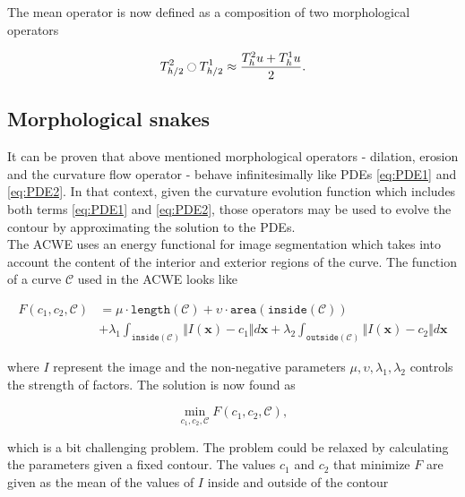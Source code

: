 The mean operator is now defined as a composition of two morphological operators

\begin{equation}
	T_{h/2}^2 \ocircle T_{h/2}^1 \approx \frac{T_h^2u + T_h^1u}{2}.
\end{equation}

\subsection{Morphological snakes}

It can be proven that above mentioned morphological operators - dilation, erosion and the curvature flow operator - behave infinitesimally like PDEs \ref{eq:PDE1} and \ref{eq:PDE2}. In that context, given the curvature evolution function which includes both terms \ref{eq:PDE1} and \ref{eq:PDE2}, those operators may be used to evolve the contour by approximating the solution to the PDEs. \\

The ACWE uses an energy functional for image segmentation which takes into account the content of the interior and exterior regions of the curve. The function of a curve $\mathcal{C}$ used in the ACWE looks like

\begin{equation}
	\begin{split}
		F(c_1,c_2, \mathcal{C}) & = \mu \cdot \mathtt{length}(\mathcal{C}) + \upsilon \cdot \mathtt{area}(\mathtt{inside}(\mathcal{C})) \\
	 & + \lambda_1 \int_{\mathtt{inside}(\mathcal{C})} \Vert I(\mathbf{x}) - c_1 \Vert d\mathbf{x} +   \lambda_2 \int_{\mathtt{outside}(\mathcal{C})} \Vert I(\mathbf{x}) - c_2 \Vert d\mathbf{x}
	\end{split}
	\label{eq:Functional}
\end{equation}

where $I$ represent the image and the non-negative parameters $\mu, \upsilon, \lambda_1, \lambda_2$ controls the strength of factors. The solution is now found as 

\begin{equation}
	\min_{c_1,c_2, \mathcal{C}} F(c_1,c_2, \mathcal{C}),
\end{equation}

which is a bit challenging problem. The problem could be relaxed by calculating the parameters given a fixed contour. The values $c_1$ and $c_2$ that minimize $F$ are given as the mean of the values of $I$ inside and outside of the contour
	
